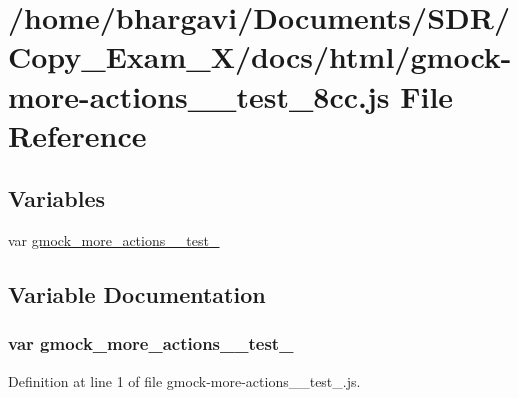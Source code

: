 \hypertarget{gmock-more-actions____test__8cc_8js}{}\section{/home/bhargavi/\+Documents/\+S\+D\+R/\+Copy\+\_\+\+Exam\+\_\+X/docs/html/gmock-\/more-\/actions\+\_\+\+\_\+test\+\_\+8cc.js File Reference}
\label{gmock-more-actions____test__8cc_8js}
\subsection*{Variables}
\begin{DoxyCompactItemize}
\item 
var \hyperlink{gmock-more-actions____test__8cc_8js_a12a387b7d38f970a1587a88fc2f0073f}{gmock\+\_\+more\+\_\+actions\+\_\+\+\_\+test\+\_}
\end{DoxyCompactItemize}


\subsection{Variable Documentation}
\subsubsection[{\texorpdfstring{gmock\+\_\+more\+\_\+actions\+\_\+\+\_\+test\+\_\+8cc}{gmock_more_actions__test_8cc}}]{\setlength{\rightskip}{0pt plus 5cm}var gmock\+\_\+more\+\_\+actions\+\_\+\+\_\+test\+\_}\hypertarget{gmock-more-actions____test__8cc_8js_a12a387b7d38f970a1587a88fc2f0073f}{}\label{gmock-more-actions____test__8cc_8js_a12a387b7d38f970a1587a88fc2f0073f}


Definition at line 1 of file gmock-\/more-\/actions\+\_\+\+\_\+test\+\_.\+js.

